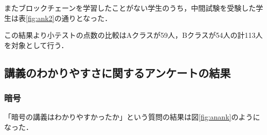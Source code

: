 \documentclass[a4j,12pt]{jsarticle}
\begin{document}
\begin{table}[H]
\centering
\caption{アンケート結果}

\label{fig:ank}
\end{table}

またブロックチェーンを学習したことがない学生のうち，中間試験を受験した学生は表\ref{fig:ank2}の通りとなった．

\begin{table}[H]
\centering
\caption{中間試験の受験状況}

\label{fig:ank2}
\end{table}

この結果より小テストの点数の比較はAクラスが59人，Bクラスが54人の計113人を対象として行う．

\newpage
\subsection{講義のわかりやすさに関するアンケートの結果}
\subsubsection{暗号}


「暗号の講義はわかりやすかったか」という質問の結果は図\ref{fig:anank}のようになった．
\end{document}
